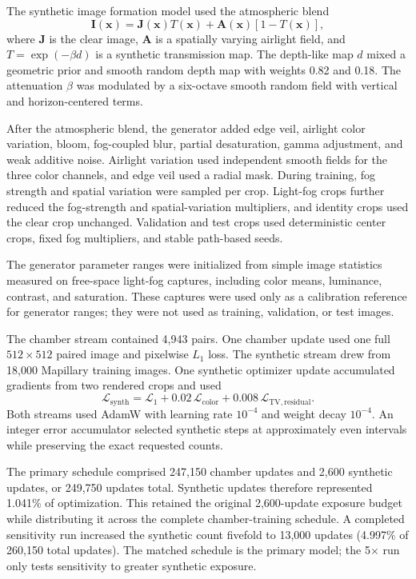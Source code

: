 \documentclass[9pt]{osa-supplemental-document}
\begin{document}
The synthetic image formation model used the atmospheric blend
\begin{equation}
\mathbf{I}(\mathbf{x}) =
\mathbf{J}(\mathbf{x})T(\mathbf{x}) +
\mathbf{A}(\mathbf{x})[1 - T(\mathbf{x})],
\label{eqS:synthetic_atmospheric_blend}
\end{equation}
where $\mathbf{J}$ is the clear image, $\mathbf{A}$ is a spatially varying airlight field, and $T=\exp(-\beta d)$ is a synthetic transmission map. The depth-like map $d$ mixed a geometric prior and smooth random depth map with weights 0.82 and 0.18. The attenuation $\beta$ was modulated by a six-octave smooth random field with vertical and horizon-centered terms.

After the atmospheric blend, the generator added edge veil,
airlight color variation, bloom, fog-coupled blur, partial
desaturation, gamma adjustment, and weak additive noise. Airlight
variation used independent smooth fields for the three color
channels, and edge veil used a radial mask. During training, fog
strength and spatial variation were sampled per crop. Light-fog
crops further reduced the fog-strength and spatial-variation
multipliers, and identity crops used the clear crop unchanged.
Validation and test crops used deterministic center crops, fixed
fog multipliers, and stable path-based seeds.

The generator parameter ranges were initialized from simple image
statistics measured on free-space light-fog captures, including
color means, luminance, contrast, and saturation. These captures
were used only as a calibration reference for generator ranges;
they were not used as training, validation, or test images.

The chamber stream contained 4{,}943 pairs. One chamber update used
one full $512\times512$ paired image and pixelwise $L_1$ loss. The
synthetic stream drew from 18{,}000 Mapillary training images. One
synthetic optimizer update accumulated gradients from two rendered
crops and used
\begin{equation}
\mathcal{L}_{\mathrm{synth}} =
\mathcal{L}_{1} + 0.02\,\mathcal{L}_{\mathrm{color}}
+ 0.008\,\mathcal{L}_{\mathrm{TV,residual}} .
\label{eqS:mixed_synthetic_loss}
\end{equation}
Both streams used AdamW with learning rate $10^{-4}$ and weight
decay $10^{-4}$. An integer error accumulator selected synthetic
steps at approximately even intervals while preserving the exact
requested counts.

The primary schedule comprised 247{,}150 chamber updates and 2{,}600
synthetic updates, or 249{,}750 updates total. Synthetic updates
therefore represented 1.041\% of optimization. This retained the
original 2{,}600-update exposure budget while distributing it across
the complete chamber-training schedule. A completed sensitivity run
increased the synthetic count fivefold to 13{,}000 updates
(4.997\% of 260{,}150 total updates). The matched schedule is the
primary model; the 5$\times$ run only tests sensitivity to greater
synthetic exposure.
\end{document}
